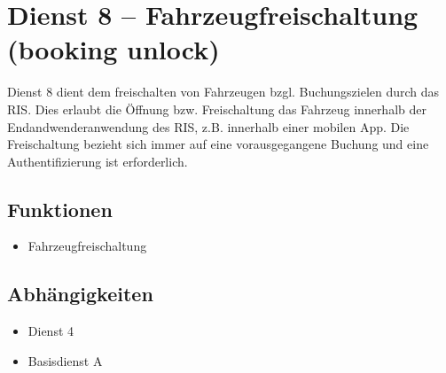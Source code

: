 \section{Dienst 8 -- Fahrzeugfreischaltung (booking unlock)}
Dienst 8 dient dem freischalten von Fahrzeugen bzgl. Buchungszielen durch das RIS. Dies erlaubt die Öffnung bzw. Freischaltung das Fahrzeug innerhalb der Endandwenderanwendung des RIS, z.B. innerhalb einer mobilen App. Die Freischaltung bezieht sich immer auf eine vorausgegangene Buchung und eine Authentifizierung ist erforderlich.

\subsection*{Funktionen}
\begin{itemize}
\item Fahrzeugfreischaltung
\end{itemize}

\subsection*{Abhängigkeiten}
\begin{itemize}
\item Dienst 4
\item Basisdienst A
\end{itemize}